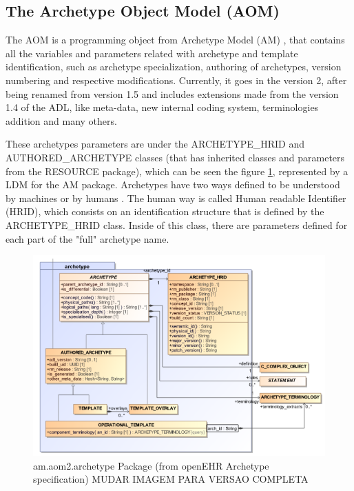 \documentclass[mim_thesis.tex]{subfiles}
\begin{document}
\subsection{The Archetype Object Model (AOM)}
The AOM is a programming object from Archetype Model (AM) \citep{openEHRAOM}, that contains all the variables and parameters related with  archetype and template identification, such as archetype specialization, authoring of archetypes, version numbering and respective modifications. Currently, it goes in the version 2, after being renamed from version 1.5 and includes extensions made from the version 1.4 of the ADL, like meta-data, new internal coding system, terminologies addition and many others. \par 
These archetypes parameters are under the ARCHETYPE\_HRID and AUTHORED\_ARCHETYPE classes (that has inherited classes and parameters from the RESOURCE package), which can be seen the figure \ref{fig:RM_archtype}, represented by a \ac{LDM} for the AM package. Archetypes have two ways defined to be understood by machines or by humans \citep{openEHRarchver}. The human way is called Human readable Identifier (HRID), which consists on an identification structure that is defined by the ARCHETYPE\_HRID class. Inside of this class, there are parameters defined for each part of the "full" archetype name.

\begin{figure}[H]
	\centering
    \includegraphics[width=1\textwidth]{img/RM_archtype.PNG}
	\caption{am.aom2.archetype Package (from openEHR Archetype specification) MUDAR IMAGEM PARA VERSAO COMPLETA}
	\label{fig:RM_archtype}
\end{figure}
\end{document}
